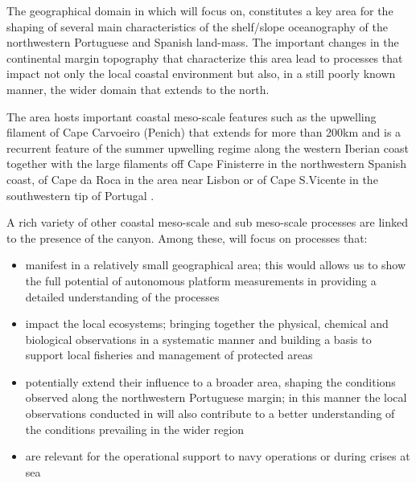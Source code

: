The geographical domain in which \proj will focus on, constitutes a
key area for the shaping of several main characteristics of the
shelf/slope oceanography of the northwestern Portuguese and Spanish
land-mass.  The important changes in the continental margin topography
that characterize this area lead to processes that impact not only the
local coastal environment but also, in a still poorly known manner,
the wider domain that extends to the north.


The area hosts important coastal meso-scale features such as the
upwelling filament of Cape Carvoeiro (Penich) that extends for more
than 200km and is a recurrent feature of the summer upwelling regime
along the western Iberian coast together with the large filaments off
Cape Finisterre in the northwestern Spanish coast, of Cape da Roca in
the area near Lisbon or of Cape S.Vicente in the southwestern tip of
Portugal \cite{haynes93}.

A rich variety of other coastal meso-scale and sub meso-scale
processes are linked to the presence of the \naz canyon. Among these,
\proj will focus on processes that:

\begin{itemize}[noitemsep,topsep=0pt,parsep=0pt,partopsep=0pt]

\item manifest in a relatively small geographical area; this would
  allows us to show the full potential of autonomous platform
  measurements in providing a detailed understanding of the processes

\item impact the local ecosystems; bringing together the physical,
  chemical and biological observations in a systematic manner and
  building a basis to support local fisheries and management of
  protected areas

\item potentially extend their influence to a broader area, shaping
  the conditions observed along the northwestern Portuguese margin; in
  this manner the local observations conducted in \proj will also
  contribute to a better understanding of the conditions prevailing in
  the wider region

\item are relevant for the operational support to navy operations or
  during crises at sea

\end{itemize}  

